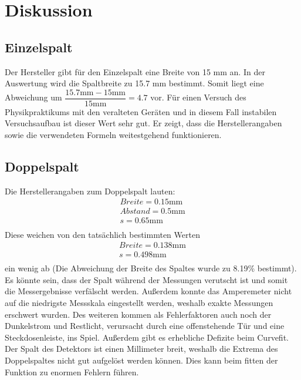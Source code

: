 \section{Diskussion}
\label{sec:Diskussion}

\subsection{Einzelspalt}
    Der Hersteller gibt für den Einzelspalt eine Breite von 15 mm an. In der Auswertung wird
    die Spaltbreite zu 15.7 mm bestimmt. Somit liegt eine Abweichung um $\dfrac{15.7 \si{\milli\metre} 
    - 15 \si{\milli\metre}}{15 \si{\milli\metre}} = 4.7 $ vor. Für einen Versuch des Physikpraktikums mit den veralteten Geräten 
    und in diesem Fall instabilen Versuchsaufbau ist dieser Wert sehr gut. Er zeigt, dass die 
    Herstellerangaben sowie die verwendeten Formeln weitestgehend funktionieren.
    
\subsection{Doppelspalt}
    Die Herstellerangaben zum Doppelspalt lauten:
    \begin{align*}
        Breite = 0.15 \si{\milli\metre}\\
        Abstand = 0.5 \si{\milli\metre}\\
        s = 0.65 \si{\milli\metre}\\
    \end{align*}
    Diese weichen von den tatsächlich bestimmten Werten 
    \begin{align*}
        Breite = 0.138 \si{\milli\metre}\\
        s = 0.498 \si{\milli\metre}\\
    \end{align*}
    ein wenig ab (Die Abweichung der Breite des Spaltes wurde zu 8.19\% bestimmt).
    Es könnte sein, dass 
    der Spalt während der Messungen verutscht ist und somit die Messergebnisse verfälscht werden.
    Außerdem konnte das Amperemeter nicht auf die niedrigste Messskala eingestellt werden, weshalb
    exakte Messungen erschwert wurden. Des weiteren kommen als Fehlerfaktoren auch noch der 
    Dunkelstrom und Restlicht, verursacht durch eine offenstehende Tür und eine Steckdosenleiste, 
    ins Spiel.
    Außerdem gibt es erhebliche Defizite beim Curvefit. Der Spalt des Detektors ist einen Millimeter 
    breit, weshalb die Extrema des Doppelspaltes nicht gut aufgelöst werden können. Dies kann beim 
    fitten der Funktion zu enormen Fehlern führen.

